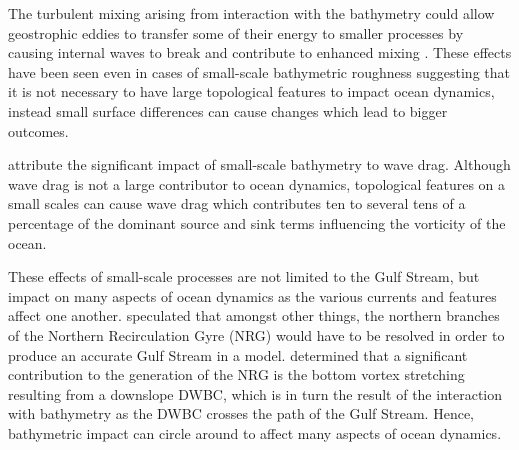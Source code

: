 \documentclass[..\EOYR.tex]{subfiles}
\begin{document}

The turbulent mixing arising from interaction with the bathymetry could allow geostrophic eddies to transfer some of their energy to smaller processes by causing internal waves to break and contribute to enhanced mixing \citep{Nikurashin2012a}. These effects have been seen even in cases of small-scale bathymetric roughness suggesting that it is not necessary to have large topological features to impact ocean dynamics, instead small surface differences can cause changes which lead to bigger outcomes.

\citep{NaveiraGarabato2013} attribute the significant impact of small-scale bathymetry to wave drag. Although wave drag is not a large contributor to ocean dynamics, topological features on a small scales can cause wave drag which contributes ten to several tens of a percentage of the dominant source and sink terms influencing the vorticity of the ocean.


These effects of small-scale processes are not limited to the Gulf Stream, but impact on many aspects of ocean dynamics as the various currents and features affect one another. 
\citep{Ezer2016b} speculated that amongst other things, the northern branches of the Northern Recirculation Gyre (NRG) would have to be resolved in order to produce an accurate Gulf Stream in a model. \citep{Zhang2007} determined that a significant contribution to the generation of the NRG is the bottom vortex stretching resulting from a downslope DWBC, which is in turn the result of the interaction with bathymetry as the DWBC crosses the path of the Gulf Stream. Hence, bathymetric impact can circle around to affect many aspects of ocean dynamics.


\end{document}
